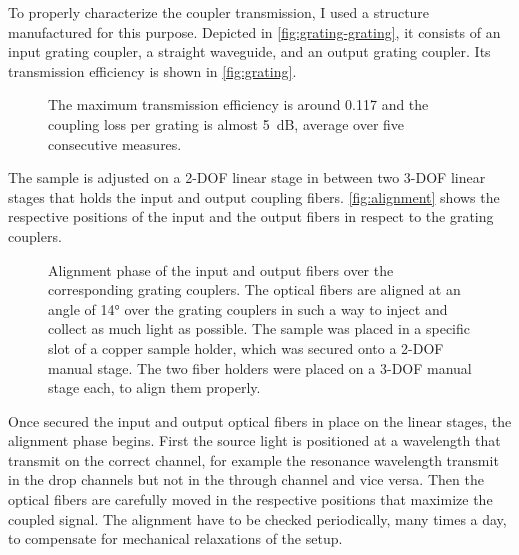 To properly characterize the coupler transmission, I used a structure manufactured for this purpose.
Depicted in \autoref{fig:grating-grating}, it consists of an input grating coupler, a straight waveguide, and an output grating coupler.
Its transmission efficiency is shown in \autoref{fig:grating}.


\begin{figure}[hbtp]
	\centering
	
	\caption{The maximum transmission efficiency is around \num{0.117} and the coupling loss per grating is almost \SI{5}{\dB}, average over five consecutive measures.}
	\label{fig:grating}
\end{figure}

The sample is adjusted on a 2-\acs{DOF} linear stage in between two 3-\acs{DOF} linear stages that holds the input and output coupling fibers.
\autoref{fig:alignment} shows the respective positions of the input and the output fibers in respect to the grating couplers.

\begin{figure}[!hbtp]
	\centering
	
	\caption{Alignment phase of the input and output fibers over the corresponding grating couplers.
	The optical fibers are aligned at an angle of \ang{14} over the grating couplers in such a way to inject and collect as much light as possible.
	The sample was placed in a specific slot of a copper sample holder, which was secured onto a 2-\acs{DOF} manual stage.
	The two fiber holders were placed on a 3-\acs{DOF} manual stage each, to align them properly.
	}
	\label{fig:alignment}
\end{figure}

\newpage
Once secured the input and output optical fibers in place on the linear stages, the alignment phase begins.
First the source light is positioned at a wavelength that transmit on the correct channel, for example the resonance wavelength transmit in the drop channels but not in the through channel and vice versa.
Then the optical fibers are carefully moved in the respective positions that maximize the coupled signal.
The alignment have to be checked periodically, many times a day, to compensate for mechanical relaxations of the setup.

